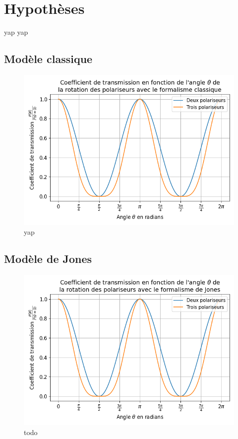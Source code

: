\documentclass[11pt,letterpaper]{article}
\begin{document}
\section{Hypothèses}

yap yap

\subsection{Modèle classique}


\begin{figure}[H]
  \centering
  \includegraphics[scale=0.7]{coeff_classique.png}
  \caption{yap}
  \label{classique}
\end{figure}

\subsection{Modèle de Jones}

\begin{figure}[H]
  \centering
  \includegraphics[scale=0.7]{coeff_jones.png}
  \caption{todo}
  \label{jones}
\end{figure}




\clearpage

%
%
\end{document}
